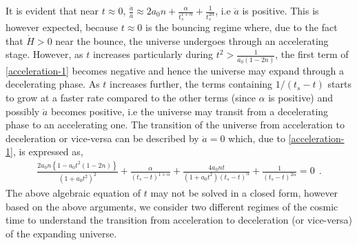 \documentclass{article}
\begin{document}
It is evident that near $t \approx 0$, $\frac{\ddot{a}}{a} \approx 2a_0n + \frac{\alpha}{t_s^{1+\alpha}} + \frac{1}{t_s^{2\alpha}}$, 
i.e $\ddot{a}$ is positive. 
This is however expected, because $t \approx 0$ is the bouncing regime where, 
due to the fact that $\dot{H} > 0$ near the bounce, the universe undergoes through an accelerating stage. However, as $t$ increases particularly 
during $t^2 > \frac{1}{a_0(1 - 2n)}$, the first term of \ref{acceleration-1} becomes negative and hence the universe may expand through 
a decelerating phase. As $t$ increases further, the terms containing $1/(t_s - t)$ starts to grow at a faster rate compared to the other terms 
(since $\alpha$ is positive) and possibly $\ddot{a}$ becomes positive, i.e the universe may transit from a decelerating phase to an accelerating one. 
The transition of the universe 
from acceleration to deceleration or vice-versa can be described by $\ddot{a} = 0$ which, due to \ref{acceleration-1}, is expressed as,
\begin{eqnarray}
 \frac{2a_0n\left\{1 - a_0t^2(1 - 2n)\right\}}{\left(1 + a_0t^2\right)^2} 
 + \frac{\alpha}{\left(t_s - t\right)^{1+\alpha}} + \frac{4a_0nt}{\left(1 + a_0t^2\right)\left(t_s - t\right)^{\alpha}} 
 + \frac{1}{\left(t_s - t\right)^{2\alpha}} = 0~~.
 \label{acceleration-2}
\end{eqnarray}
The above algebraic equation of $t$ may not be solved in a closed form, however based on the above arguments, we consider two different 
regimes of the cosmic time to understand the transition from acceleration to deceleration (or vice-versa) of the expanding universe.
\end{document}
